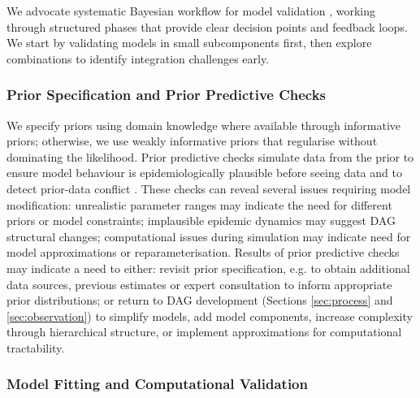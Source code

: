 \documentclass{article}
\begin{document}
We advocate systematic Bayesian workflow for model validation \citep{gelman2020bayesian}, working through structured phases that provide clear decision points and feedback loops.
We start by validating models in small subcomponents first, then explore combinations to identify integration challenges early.

\subsubsection{Prior Specification and Prior Predictive Checks}

We specify priors using domain knowledge where available through informative priors; otherwise, we use weakly informative priors that regularise without dominating the likelihood.
Prior predictive checks simulate data from the prior to ensure model behaviour is epidemiologically plausible before seeing data and to detect prior-data conflict \citep{Box1980,yang2025detecting}.
These checks can reveal several issues requiring model modification: unrealistic parameter ranges may indicate the need for different priors or model constraints; implausible epidemic dynamics may suggest DAG structural changes; computational issues during simulation may indicate need for model approximations or reparameterisation.
Results of prior predictive checks may indicate a need to either: revisit prior specification, e.g. to obtain additional data sources, previous estimates or expert consultation to inform appropriate prior distributions; or return to DAG development (Sections \ref{sec:process} and \ref{sec:observation}) to simplify models, add model components, increase complexity through hierarchical structure, or implement approximations for computational tractability.

\subsubsection{Model Fitting and Computational Validation}
\end{document}
